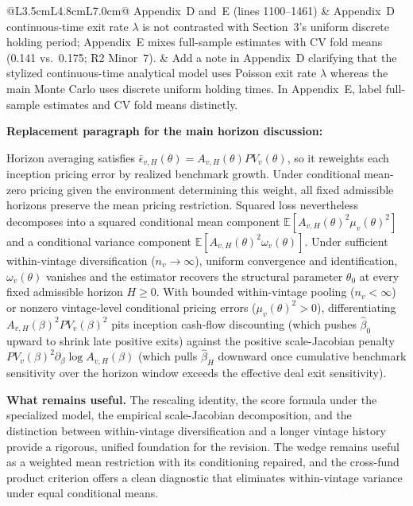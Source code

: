 \documentclass[11pt]{article}
\newcommand{\E}{\mathbb{E}}
\theoremstyle{plain}
\theoremstyle{definition}
\begin{document}
{\begin{longtable}{@{}L{3.5cm}L{4.8cm}L{7.0cm}@{}}
Appendix~D and~E (lines 1100--1461) & Appendix~D continuous-time exit rate $\lambda$ is not contrasted with Section~3's uniform discrete holding period; Appendix~E mixes full-sample estimates with CV fold means (0.141 vs.\ 0.175; R2 Minor~7). & Add a note in Appendix~D clarifying that the stylized continuous-time analytical model uses Poisson exit rate $\lambda$ whereas the main Monte Carlo uses discrete uniform holding times. In Appendix~E, label full-sample estimates and CV fold means distinctly.\\
\bottomrule
\end{longtable}
}

\textbf{Replacement paragraph for the main horizon discussion:}
\begin{draft}
Horizon averaging satisfies $\bar\epsilon_{v,H}(\theta)=A_{v,H}(\theta)PV_v(\theta)$, so it reweights each inception pricing error by realized benchmark growth. Under conditional mean-zero pricing given the environment determining this weight, all fixed admissible horizons preserve the mean pricing restriction. Squared loss nevertheless decomposes into a squared conditional mean component $\E[A_{v,H}(\theta)^2\mu_v(\theta)^2]$ and a conditional variance component $\E[A_{v,H}(\theta)^2\omega_v(\theta)]$. Under sufficient within-vintage diversification ($n_v\to\infty$), uniform convergence and identification, $\omega_v(\theta)$ vanishes and the estimator recovers the structural parameter $\theta_0$ at every fixed admissible horizon $H\ge 0$. With bounded within-vintage pooling ($n_v<\infty$) or nonzero vintage-level conditional pricing errors ($\mu_v(\theta)^2>0$), differentiating $A_{v,H}(\beta)^2 PV_v(\beta)^2$ pits inception cash-flow discounting (which pushes $\hat\beta_0$ upward to shrink late positive exits) against the positive scale-Jacobian penalty $PV_v(\beta)^2\partial_\beta\log A_{v,H}(\beta)$ (which pulls $\hat\beta_H$ downward once cumulative benchmark sensitivity over the horizon window exceeds the effective deal exit sensitivity).
\end{draft}

\textbf{What remains useful.} The rescaling identity, the score formula under the specialized model, the empirical scale-Jacobian decomposition, and the distinction between within-vintage diversification and a longer vintage history provide a rigorous, unified foundation for the revision. The wedge remains useful as a weighted mean restriction with its conditioning repaired, and the cross-fund product criterion offers a clean diagnostic that eliminates within-vintage variance under equal conditional means.
\end{document}
